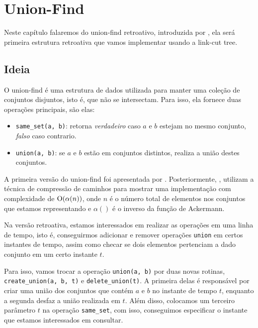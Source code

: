 
\chapter{Union-Find}
\label{cap:union-find}

Neste capítulo falaremos do union-find retroativo, introduzida por \citet{10.1145/1240233.1240236}, ela será primeira estrutura retroativa que vamos implementar usando a link-cut tree.

\section{Ideia}
\label{sec:uf-ideia}

O union-find é uma estrutura de dados utilizada para manter uma coleção de conjuntos disjuntos, isto é, que não se intersectam. Para isso, ela fornece duas operações principais, são elas:

\begin{itemize}
    \item \texttt{same\_set(a, b)}: retorna \emph{verdadeiro} caso $a$ e $b$ estejam no mesmo conjunto, \emph{falso} caso contrario.
    \item \texttt{union(a, b)}: se $a$ e $b$ estão em conjuntos distintos, realiza a união destes conjuntos.
\end{itemize}

A primeira versão do union-find foi apresentada por \citet{10.1145/364099.364331}. Posteriormente, \citet{10.1145/62.2160}, utilizam a técnica de compressão de caminhos para mostrar uma implementação com complexidade de $\mathrm{O}( \alpha (n) )$, onde $n$ é o número total de elementos nos conjuntos que estamos representando e $\alpha()$ é o inverso da função de Ackermann.

Na versão retroativa, estamos interessados em realizar as operações em uma linha de tempo, isto é, conseguirmos adicionar e remover operações \texttt{union} em certos instantes de tempo, assim como checar se dois elementos pertenciam a dado conjunto em um certo instante $t$.

Para isso, vamos trocar a operação \texttt{union(a, b)} por duas novas rotinas, \texttt{create\_union(a, b, t)} e \texttt{delete\_union(t)}. A primeira delas é responsável por criar uma união dos conjuntos que contém $a$ e $b$ no instante de tempo $t$, enquanto a segunda desfaz a união realizada em $t$. Além disso, colocamos um terceiro parâmetro $t$ na operação \texttt{same\_set}, com isso, conseguimos especificar o instante que estamos interessados em consultar.

